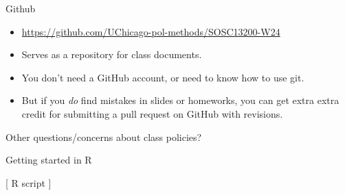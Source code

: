 \documentclass[xcolor={dvipsnames}, handout]{beamer}
\begin{document}
\begin{frame}{Github}

\begin{itemize}
\item \url{https://github.com/UChicago-pol-methods/SOSC13200-W24}\pause
\item Serves as a repository for class documents. \pause
\item You don't need a GitHub account, or need to know how to use git. \pause
\item But if you \textit{do} find mistakes in slides or homeworks, you can get extra extra credit for submitting a pull request on GitHub with revisions. 
\end{itemize}

\end{frame}



\begin{frame}

\begin{center}
Other questions/concerns about class policies?
\end{center}

\end{frame}



\begin{frame}{Getting started in R}

\begin{center}
{[} R script {]}
\end{center}

\end{frame}




\end{document}
